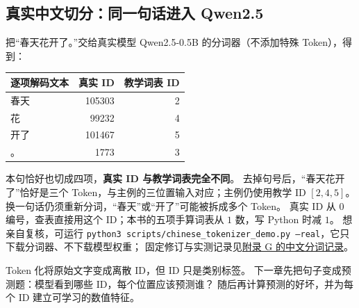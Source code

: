 \subsection{真实中文切分：同一句话进入 Qwen2.5}
\label{sec:chinese-tokenization}
\label{experiment:real-chinese-tokenizer}
把“春天花开了。”交给真实模型 Qwen2.5-0.5B 的分词器（不添加特殊 Token），得到：
\begin{center}\small
{}
\begin{tabular}{@{}lrr@{}}\toprule
逐项解码文本 & 真实 ID & 教学词表 ID\\\midrule
春天 & 105303 & 2\\
花 & 99232 & 4\\
开了 & 101467 & 5\\
。 & 1773 & 3\\\bottomrule
\end{tabular}
\end{center}
本句恰好也切成四项，\textbf{真实 ID 与教学词表完全不同}。
去掉句号后，“春天花开了”恰好是三个 Token，与主例的三位置输入对应；主例仍使用教学 ID $[2,4,5]$。
换一句话仍须重新分词，“春天”或“开了”可能被拆成多个 Token。
真实 ID 从 $0$ 编号，查表直接用这个 ID；本书的五项手算词表从 $1$ 数，写 Python 时减 $1$。
想亲自复核，可运行 \texttt{python3 scripts/chinese\_tokenizer\_demo.py --real}，它只下载分词器、不下载模型权重；
固定修订与实测记录见\hyperref[app:tokenizer-record]{附录 G 的中文分词记录}。



\par\smallskip
Token 化将原始文字变成离散 ID，但 ID 只是类别标签。
下一章先把句子变成预测题：模型看到哪些 ID，每个位置应该预测谁？
随后再计算预测的好坏，并为每个 ID 建立可学习的数值特征。
